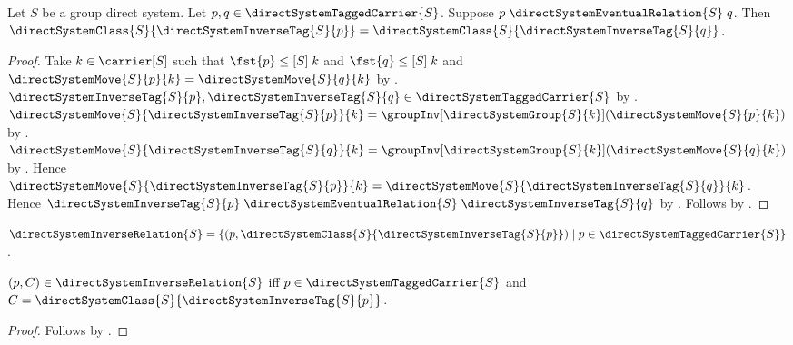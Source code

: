 \begin{lemma}\label{direct_system_inverse_class_respects_equivalence}
    Let $S$ be a group direct system.
    Let $p,q\in\directSystemTaggedCarrier{S}$.
    Suppose $p\mathrel{\directSystemEventualRelation{S}}q$.
    Then
        $\directSystemClass{S}{\directSystemInverseTag{S}{p}}
        =\directSystemClass{S}{\directSystemInverseTag{S}{q}}$.
\end{lemma}
\begin{proof}
    Take $k\in\carrier[S]$ such that
        $\fst{p}\mathrel{\leq[S]}k$ and
        $\fst{q}\mathrel{\leq[S]}k$ and
        $\directSystemMove{S}{p}{k}
            =\directSystemMove{S}{q}{k}$ by
        .
    $\directSystemInverseTag{S}{p},
        \directSystemInverseTag{S}{q}\in
        \directSystemTaggedCarrier{S}$ by
        .
    $\directSystemMove{S}{\directSystemInverseTag{S}{p}}{k}
        =\groupInv[\directSystemGroup{S}{k}]
            (\directSystemMove{S}{p}{k})$ by
        .
    $\directSystemMove{S}{\directSystemInverseTag{S}{q}}{k}
        =\groupInv[\directSystemGroup{S}{k}]
            (\directSystemMove{S}{q}{k})$ by
        .
    Hence $\directSystemMove{S}{\directSystemInverseTag{S}{p}}{k}
        =\directSystemMove{S}{\directSystemInverseTag{S}{q}}{k}$.
    Hence $\directSystemInverseTag{S}{p}
        \mathrel{\directSystemEventualRelation{S}}
        \directSystemInverseTag{S}{q}$ by
        .
    Follows by .
\end{proof}

\begin{definition}\label{direct_system_inverse_relation}
    $\directSystemInverseRelation{S}=
        \{(p,\directSystemClass{S}{\directSystemInverseTag{S}{p}})
            \mid p\in\directSystemTaggedCarrier{S}\}$.
\end{definition}

\begin{proposition}\label{direct_system_inverse_relation_iff}
    $(p,C)\in\directSystemInverseRelation{S}$ iff
        $p\in\directSystemTaggedCarrier{S}$ and
        $C=\directSystemClass{S}{\directSystemInverseTag{S}{p}}$.
\end{proposition}
\begin{proof}
    Follows by
        .
\end{proof}

